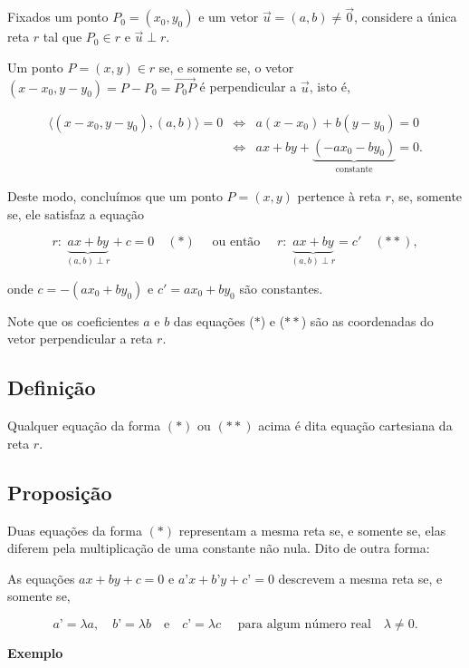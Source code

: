 \documentclass[
  brazilian,
  letterpaper,
  DIV=11,
  numbers=noendperiod]{scrreprt}
\theoremstyle{definition}
\theoremstyle{plain}
\theoremstyle{definition}
\theoremstyle{remark}
\begin{document}
Fixados um ponto \(P_0 = (x_0, y_0)\) e um vetor
\(\vec{u} = (a, b) \neq \vec{0}\), considere a única reta \(r\) tal que
\(P_0 \in r\) e \(\vec{u} \perp r\).

Um ponto \(P = (x, y) \in r\) se, e somente se, o vetor
\((x - x_0, y - y_0) = P - P_0 = \overrightarrow{P_0P}\) é perpendicular
a \(\vec{u}\), isto é,

\[
\begin{array}{lcl}\langle (x - x_0, y - y_0), (a, b) \rangle = 0 & \Leftrightarrow &  a(x - x_0) + b(y - y_0) = 0 \\           &\Leftrightarrow &  ax + by + \underbrace{(-ax_0 - by_0)}_{\text{constante}} = 0.\end{array}
\]

Deste modo, concluímos que um ponto \(P = (x, y)\) pertence à reta
\(r\), se, somente se, ele satisfaz a equação

\[
r: \: \underbrace{ax + by}_{(a,b)\perp r} + c= 0 \quad (\ast) \quad \text{ ou então } \quad r: \: \underbrace{ax + by}_{(a,b)\perp r} = c' \quad (\ast \ast), 
\]

onde \(c =-( ax_0 + by_0)\) e \(c'=  ax_0 + by_0\) são constantes.

Note que os coeficientes \(a\) e \(b\) das equações (\(\ast\)) e
(\(\ast \ast\)) são as coordenadas do vetor perpendicular a reta \(r\).

\subsection{Definição}\label{definiuxe7uxe3o-10}

Qualquer equação da forma \((\ast)\) ou \((\ast\ast)\) acima é dita
equação cartesiana da reta \(r\).

\subsection{Proposição}\label{proposiuxe7uxe3o-11}

Duas equações da forma \((\ast)\) representam a mesma reta se, e somente
se, elas diferem pela multiplicação de uma constante não nula. Dito de
outra forma:

As equações \(ax+by+c=0\) e \(a’x+b’y+c’=0\) descrevem a mesma reta se,
e somente se,

\[
   a’=\lambda a, \quad b’=\lambda b \quad\text{e}\quad  c’=\lambda c \quad \text{ para algum número real}\quad \lambda \neq 0.
\]

\textbf{Exemplo}
\end{document}
